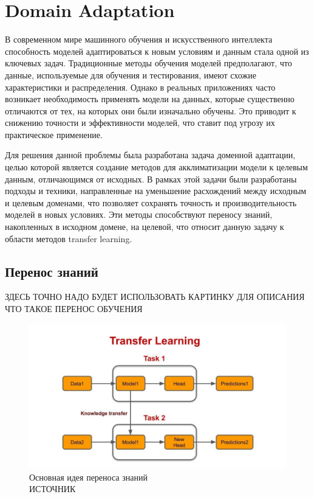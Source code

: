 \section{Domain Adaptation}
\label{sec:Chapter3} 

В современном мире машинного обучения и искусственного интеллекта способность моделей адаптироваться к новым условиям и данным стала одной из ключевых задач. Традиционные методы обучения моделей предполагают, что данные, используемые для обучения и тестирования, имеют схожие характеристики и распределения. Однако в реальных приложениях часто возникает необходимость применять модели на данных, которые существенно отличаются от тех, на которых они были изначально обучены. Это приводит к снижению точности и эффективности моделей, что ставит под угрозу их практическое применение.

Для решения данной проблемы была разработана задача доменной адаптации, целью которой является создание методов для акклиматизации модели к целевым данным, отличающимся от исходных. В рамках этой задачи были разработаны подходы и техники, направленные на уменьшение расхождений между исходным и целевым доменами, что позволяет сохранять точность и производительность моделей в новых условиях. Эти методы способствуют переносу знаний, накопленных в исходном домене, на целевой, что относит данную задачу к области методов transfer learning.

\subsection{Перенос знаний}

ЗДЕСЬ ТОЧНО НАДО БУДЕТ ИСПОЛЬЗОВАТЬ КАРТИНКУ ДЛЯ ОПИСАНИЯ ЧТО ТАКОЕ ПЕРЕНОС ОБУЧЕНИЯ

\begin{figure}[h]
	\centering
	\includegraphics[width=.9\textwidth]{./images/TL_medium.jpg}
	\caption{Основная идея переноса знаний\\ИСТОЧНИК}
	\label{fig:tl}
\end{figure}

